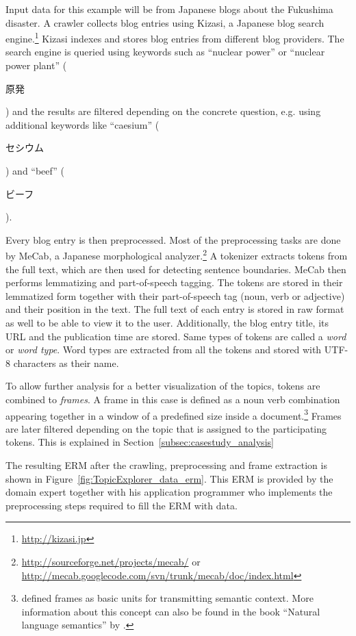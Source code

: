 Input data for this example will be from Japanese blogs about the Fukushima disaster. A crawler collects blog entries using Kizasi, a Japanese blog search engine.\footnote{\url{http://kizasi.jp}} Kizasi indexes and stores blog entries from different blog providers. The search engine is queried using keywords such as ``nuclear power'' or ``nuclear power plant'' (\begin{CJK}{UTF8}{}原発\end{CJK}) and the results are filtered depending on the concrete question, e.g. using additional keywords like ``caesium'' (\begin{CJK}{UTF8}{}セシウム\end{CJK}) and ``beef'' (\begin{CJK}{UTF8}{}ビーフ\end{CJK}).

Every blog entry is then preprocessed. Most of the preprocessing tasks are done by MeCab, a Japanese morphological analyzer.\footnote{\url{http://sourceforge.net/projects/mecab/} or \url{http://mecab.googlecode.com/svn/trunk/mecab/doc/index.html}} A tokenizer extracts tokens from the full text, which are then used for detecting sentence boundaries. MeCab then performs lemmatizing and part-of-speech tagging. The tokens are stored in their lemmatized form together with their part-of-speech tag (noun, verb or adjective) and their position in the text. The full text of each entry is stored in raw format as well to be able to view it to the user. Additionally, the blog entry title, its URL and the publication time are stored. Same types of tokens are called a \emph{word} or \emph{word type}. Word types are extracted from all the tokens and stored with UTF-8 characters as their name.

To allow further analysis for a better visualization of the topics, tokens are combined to \emph{frames}. A frame in this case is defined as a noun verb combination appearing together in a window of a predefined size inside a document.\footnote{\textcite{minsky1977frame} defined frames as basic units for transmitting semantic context. More information about this concept can also be found in the book ``Natural language semantics'' by \textcite{allan2001natural}.} Frames are later filtered depending on the topic that is assigned to the participating tokens. This is explained in Section~\ref{subsec:casestudy_analysis}

The resulting ERM after the crawling, preprocessing and frame extraction is shown in Figure~\ref{fig:TopicExplorer_data_erm}. This ERM is provided by the domain expert together with his application programmer who implements the preprocessing steps required to fill the ERM with data.

